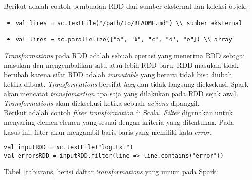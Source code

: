 Berikut adalah contoh pembuatan RDD dari sumber eksternal dan koleksi objek:
\begin{itemize}

\item
\begin{verbatim}
val lines = sc.textFile("/path/to/README.md") \\ sumber eksternal
\end{verbatim}

\item
\begin{verbatim}
val lines = sc.parallelize(["a", "b", "c", "d", "e"]) \\ array 
\end{verbatim}

\end{itemize}


\textit{Transformations} pada RDD adalah sebuah operasi yang menerima RDD sebagai masukan dan mengembalikan satu atau lebih RDD baru. RDD masukan tidak berubah karena sifat RDD adalah \textit{immutable} yang berarti tidak bisa diubah ketika dibuat. \textit{Transformations} bersifat \textit{lazy} dan tidak langsung dieksekusi, Spark akan mencatat \textit{transfomartion} apa saja yang dilakukan pada RDD sejak awal. \textit{Transformations} akan dieksekusi ketika sebuah \textit{actions} dipanggil.\\

Berikut adalah contoh \textit{filter} \textit{transformation} di Scala. \textit{Filter} digunakan untuk menyaring elemen-elemen yang sesuai dengan kriteria yang ditentukan. Pada kasus ini, filter akan mengambil baris-baris yang memiliki kata \textit{error}.
\begin{verbatim}
val inputRDD = sc.textFile("log.txt") 
val errorsRDD = inputRDD.filter(line => line.contains("error"))
\end{verbatim}

Tabel~\ref{tab:trans} berisi daftar \textit{transformations} yang umum pada Spark:

